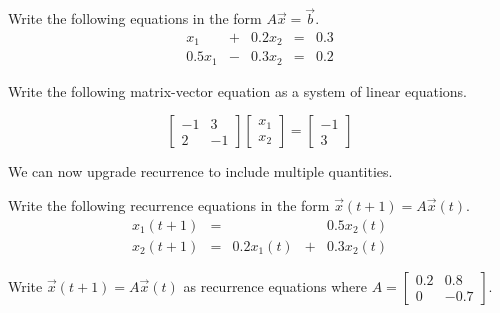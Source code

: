 \documentclass[../main.tex]{subfiles}
\begin{document}
\begin{example} \label{ex:vectors-system-to-matrix}
  Write the following equations in the form \(A \vec{x} = \vec{b}\).
  \[
    \begin{array}{rcrcr}
      x_{1} &+& 0.2 x_{2} &=& 0.3 \\
      0.5 x_{1} &-& 0.3 x_{2} &=& 0.2
    \end{array}
  \]

\end{example}

\begin{example} \label{ex:vectors-matrix-to-system}
  Write the following matrix-vector equation as a system of linear equations.

  \[
    \begin{bmatrix}
      -1 & 3 \\
       2 & -1 
    \end{bmatrix}
    \begin{bmatrix}
      x_{1} \\
      x_{2}
    \end{bmatrix}
    =
    \begin{bmatrix}
      -1 \\
      3
    \end{bmatrix}
  \]

  \blanks*
\end{example}
\clearpage

\faStar{} We can now upgrade recurrence to include multiple quantities. 
\begin{example} \label{ex:vectors-recurrence-to-matrix}
  Write the following recurrence equations in the form \(\vec{x}(t+1) = A \vec{x}(t)\).
  \[
    \begin{array}{rcrcr}
      x_{1}(t+1) &=& & & 0.5 x_{2}(t) \\
      x_{2}(t+1) &=& 0.2 x_{1}(t) &+& 0.3 x_{2}(t)
    \end{array}
  \]

\end{example}

\begin{example} \label{ex:vectors-matrix-to-recurrence}
  Write \(\vec{x}(t+1) = A \vec{x}(t)\) as recurrence equations where \(A = \begin{bmatrix} 0.2 & 0.8 \\ 0 & -0.7 \end{bmatrix}\).

\end{example}
\end{document}

